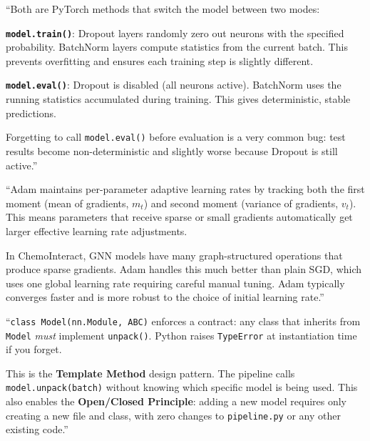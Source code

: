 \documentclass[12pt,a4paper,oneside]{book}
\begin{document}
\begin{tcolorbox}[questionbox,title={Q8: \texttt{model.train()} vs \texttt{model.eval()} -- what is the difference?}]
\end{tcolorbox}
\begin{tcolorbox}[answerbox]
``Both are PyTorch methods that switch the model between two modes:

\textbf{\texttt{model.train()}}: Dropout layers randomly zero out neurons with the specified probability. BatchNorm layers compute statistics from the current batch. This prevents overfitting and ensures each training step is slightly different.

\textbf{\texttt{model.eval()}}: Dropout is disabled (all neurons active). BatchNorm uses the running statistics accumulated during training. This gives deterministic, stable predictions.

Forgetting to call \texttt{model.eval()} before evaluation is a very common bug: test results become non-deterministic and slightly worse because Dropout is still active.''
\end{tcolorbox}

\begin{tcolorbox}[questionbox,title={Q9: Why Adam instead of SGD?}]
\end{tcolorbox}
\begin{tcolorbox}[answerbox]
``Adam maintains per-parameter adaptive learning rates by tracking both the first moment (mean of gradients, $m_t$) and second moment (variance of gradients, $v_t$). This means parameters that receive sparse or small gradients automatically get larger effective learning rate adjustments.

In ChemoInteract, GNN models have many graph-structured operations that produce sparse gradients. Adam handles this much better than plain SGD, which uses one global learning rate requiring careful manual tuning. Adam typically converges faster and is more robust to the choice of initial learning rate.''
\end{tcolorbox}

\begin{tcolorbox}[questionbox,title={Q10: Why use an abstract base class for models?}]
\end{tcolorbox}
\begin{tcolorbox}[answerbox]
``\texttt{class Model(nn.Module, ABC)} enforces a contract: any class that inherits from \texttt{Model} \textit{must} implement \texttt{unpack()}. Python raises \texttt{TypeError} at instantiation time if you forget.

This is the \textbf{Template Method} design pattern. The pipeline calls \texttt{model.unpack(batch)} without knowing which specific model is being used. This also enables the \textbf{Open/Closed Principle}: adding a new model requires only creating a new file and class, with zero changes to \texttt{pipeline.py} or any other existing code.''
\end{tcolorbox}
\end{document}
